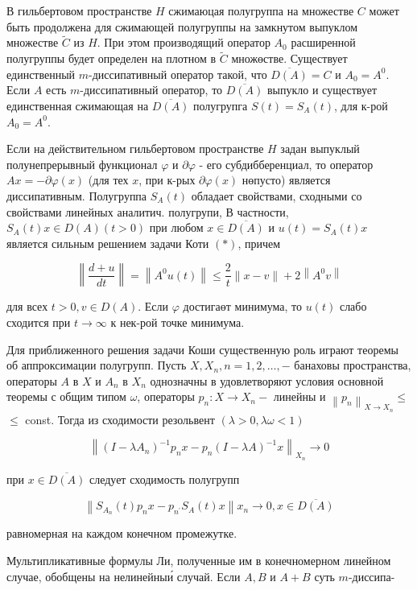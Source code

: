 \documentclass[10pt]{article}
\begin{document}
В гильбертовом пространстве $H$ сжимаюцая полугруппа на множестве $C$ может быть продолжена для сжимающей полугруппы на замкнутом выпуклом множестве $\tilde{C}$ из $H$. При этом производящий оператор $A_{0}$ расширенной полугруппы будет определен на плотном в $\tilde{C}$ множөстве. Существует единственный $m$-диссипативный оператор такой, что $\overline{D(A)}=C$ и $A_{0}=A^{0}$. Если $A$ есть $m$-диссипативный оператор, то $\overline{D(A)}$ выпукло и существует единственная сжимающая на $\overline{D(A)}$ полугрупга $S(t)=S_{A}(t)$, для к-рой $A_{0}=A^{0}$.



Если на действительном гильбертовом пространстве $H$ задан выпуклый полунепрерывный функционал $\varphi$ и $\partial \varphi$ - его субдибберенциал, то оператор $A x=-\partial \varphi(x)$ (для тех $x$, при к-рых $\partial \varphi(x)$ нөпусто) является диссипативным. Полугруппа $S_{A}(t)$ обладает свойствами, сходными со свойствами линейных аналитич. полугрупи, В частности, $S_{A}(t) x \in D(A)(t>0)$ при любом $x \in \overline{D(A)}$ и $u(t)=S_{A}(t) x$ является сильным решением задачи Коти $(*)$, причем



\[

\left\|\frac{d+u}{d t}\right\|=\left\|A^{0} u(t)\right\| \leqslant \frac{2}{t}\|x-v\|+2\left\|A^{0} v\right\|

\]



для всех $t>0, v \in D(A)$. Если $\varphi$ достигаөт минимума, то $u(t)$ слабо сходится при $t \rightarrow \infty$ к нек-рой точке минимума.



Для приближенного решения задачи Коши существенную роль играют теоремы об аппроксимации полугрупп. Пусть $X, X_{n}, n=1,2, \ldots,-$ банаховы пространства, операторы $A$ в $X$ и $A_{n}$ в $X_{n}$ однозначны в удовлетворяют условия основной теоремы с общим типом $\omega$, операторы $p_{n}: X \rightarrow X_{n}-$ линейны и $\left\|p_{n}\right\|_{X \rightarrow X_{n}} \leqslant$ $\leqslant$ const. Тогда из сходимости резольвент $(\lambda>0, \lambda \omega<1)$



\[

\left\|\left(I-\lambda A_{n}\right)^{-1} p_{n} x-p_{n}(I-\lambda A)^{-1} x\right\|_{X_{n}} \rightarrow 0

\]



при $x \in \overline{D(A)}$ следует сходимость полугрупп



\[

\left\|S_{A_{n}}(t) p_{n} x-p_{n^{\prime}} S_{A}(t) x\right\| x_{n} \longrightarrow 0, x \in \overline{D(A)}

\]



равномерная на каждом конечном промежутке.



Мультипликативные формулы Ли, полученные им в конечномерном линейном случае, обобщены на нелинейныи́ случай. Если $A, B$ и $A+B$ суть $m$-диссипа-
\end{document}

